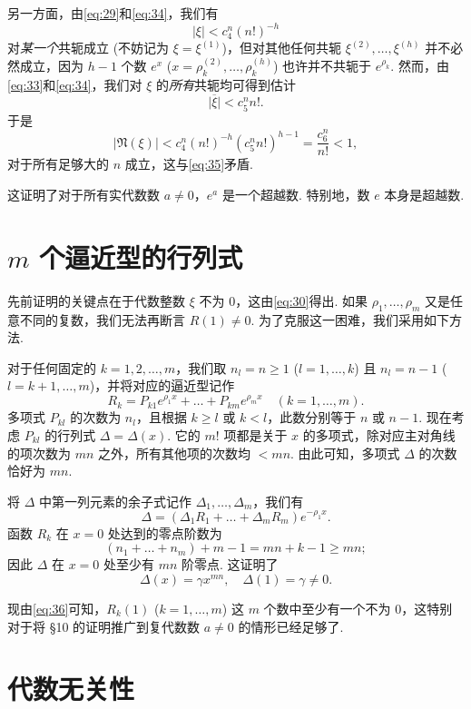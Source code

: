 另一方面，由\eqref{eq:29}和\eqref{eq:34}，我们有
\[ |\xi| < c_4^n(n!)^{-h} \]
对\textit{某一个}共轭成立 (不妨记为 $\xi = \xi^{(1)}$)，但对其他任何共轭 $\xi^{(2)}, \ldots, \xi^{(h)}$ 并不必然成立，因为 $h-1$ 个数 $e^x$ ($x=\rho_k^{(2)},\ldots,\rho_k^{(h)}$) 也许并不共轭于 $e^{\rho_k}$. 然而，由\eqref{eq:33}和\eqref{eq:34}，我们对 $\xi$ 的\textit{所有}共轭均可得到估计
\[ \overline{|\xi|} < c_5^n n!. \]
于是
\[ |\mathfrak{N}(\xi)| < c_4^n(n!)^{-h}(c_5^n n!)^{h-1} = \frac{c_6^n}{n!} < 1, \]
对于所有足够大的 $n$ 成立，这与\eqref{eq:35}矛盾.

这证明了对于所有实代数数 $a \neq 0$，$e^a$ 是一个超越数. 特别地，数 $e$ 本身是超越数.

\section{$m$ 个逼近型的行列式}

先前证明的关键点在于代数整数 $\xi$ 不为 0，这由\eqref{eq:30}得出. 如果 $\rho_1, \dots, \rho_m$ 又是任意不同的复数，我们无法再断言 $R(1) \neq 0$. 为了克服这一困难，我们采用如下方法.

对于任何固定的 $k=1, 2, \dots, m$，我们取 $n_l = n \geq 1$ ($l=1, \dots, k$) 且 $n_l = n-1$ ($l=k+1, \dots, m$)，并将对应的逼近型记作
\[ R_{k} = P_{k1} e^{\rho_{1}x} + \dots + P_{km} e^{\rho_{m}x} \quad (k=1,\dots,m). \]
多项式 $P_{kl}$ 的次数为 $n_l$，且根据 $k \geq l$ 或 $k < l$，此数分别等于 $n$ 或 $n-1$. 现在考虑 $P_{kl}$ 的行列式 $\Delta = \Delta(x)$. 它的 $m!$ 项都是关于 $x$ 的多项式，除对应主对角线的项次数为 $mn$ 之外，所有其他项的次数均 $< mn$. 由此可知，多项式 $\Delta$ 的次数恰好为 $mn$.

将 $\Delta$ 中第一列元素的余子式记作 $\Delta_1, \dots, \Delta_m$，我们有
\begin{equation} \Delta = (\Delta_1 R_1 + \dots + \Delta_m R_m) e^{-\rho_1 x}. \tag{36}\label{eq:36} \end{equation}
函数 $R_k$ 在 $x=0$ 处达到的零点阶数为
\[ (n_1 + \dots + n_m) + m-1 = mn + k-1 \geq mn; \]
因此 $\Delta$ 在 $x=0$ 处至少有 $mn$ 阶零点. 这证明了
\[ \Delta(x) = \gamma x^{mn}, \quad \Delta(1) = \gamma \neq 0. \]

现由\eqref{eq:36}可知，$R_k(1)$ ($k=1,\dots,m$) 这 $m$ 个数中至少有一个不为 0，这特别对于将 \S 10 的证明推广到复代数数 $a \neq 0$ 的情形已经足够了.

\section{代数无关性}

